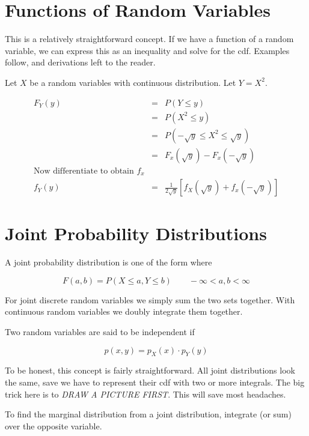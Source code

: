 \section{Functions of Random Variables}
This is a relatively straightforward concept. If we have a function of a random variable, we can express this as an
inequality and solve for the cdf. Examples follow, and derivations left to the reader.\newline

Let $X$ be a random variables with continuous distribution. Let $Y = X^2$.

\[
    \begin{aligned}
        F_Y(y) &=& P\left( Y \le y \right)\\
               &=& P\left( X^2 \le y \right)\\
               &=& P\left( -\sqrt{y} \le X^2 \le \sqrt{y} \right)\\
               &=& F_x(\sqrt{y}) - F_x(-\sqrt{y})\\
        \text{Now differentiate to obtain $f_x$}\\
        f_Y(y) &=& \frac{1}{2\sqrt{y}} \left[ f_X(\sqrt{y}) + f_x(-\sqrt{y}) \right]
    \end{aligned}
\]

\section{Joint Probability Distributions}
A joint probability distribution is one of the form where

\[
    F(a, b) = P\left( X \le a, Y \le b \right) \qquad -\infty < a, b < \infty
\]

For joint discrete random variables we simply sum the two sets together. With continuous random variables we doubly
integrate them together.\newline

Two random variables are said to be independent if

\[
    p(x, y) = p_X(x) \cdot p_Y(y)
\]

To be honest, this concept is fairly straightforward. All joint distributions look the same, save we have to represent
their cdf with two or more integrals. The big trick here is to \textit{DRAW A PICTURE FIRST}. This will save most
headaches.\newline

To find the marginal distribution from a joint distribution, integrate (or sum) over the opposite variable.

